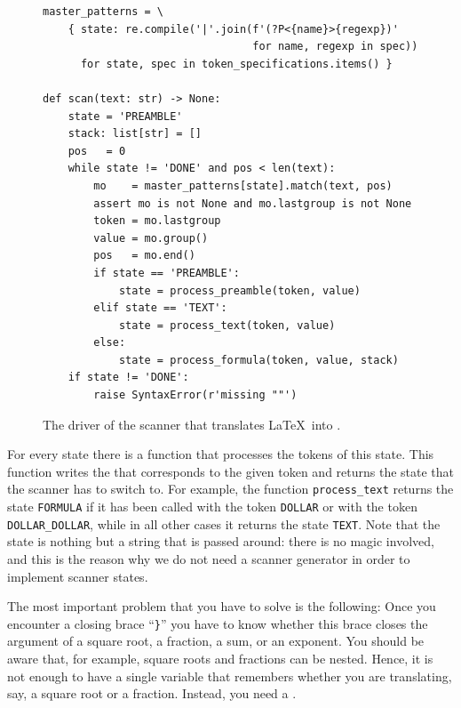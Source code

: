 \begin{figure}[!ht]
\centering
  \begin{verbatim}
master_patterns = \
    { state: re.compile('|'.join(f'(?P<{name}>{regexp})'
                                 for name, regexp in spec))
      for state, spec in token_specifications.items() }

def scan(text: str) -> None:
    state = 'PREAMBLE'
    stack: list[str] = []
    pos   = 0
    while state != 'DONE' and pos < len(text):
        mo    = master_patterns[state].match(text, pos)
        assert mo is not None and mo.lastgroup is not None
        token = mo.lastgroup
        value = mo.group()
        pos   = mo.end()
        if state == 'PREAMBLE':
            state = process_preamble(token, value)
        elif state == 'TEXT':
            state = process_text(token, value)
        else:
            state = process_formula(token, value, stack)
    if state != 'DONE':
        raise SyntaxError(r'missing ""')
\end{verbatim}
\vspace*{-0.3cm}
\caption{The driver of the scanner that translates \LaTeX\ into .}
\label{fig:latex2html.py}
\end{figure}

\noindent
For every state there is a function that processes the tokens of this state.  This function writes the
\simtextsc{MathML} that corresponds to the given token and returns the state that the scanner has to switch to.
For example, the function \texttt{process\_text} returns the state \texttt{FORMULA} if it has been called with
the token \texttt{DOLLAR} or with the token \texttt{DOLLAR\_DOLLAR}, while in all other cases it returns the
state \texttt{TEXT}.  Note that the state is nothing but a string that is passed around: there is no magic
involved, and this is the reason why we do not need a scanner generator in order to implement scanner states.

\remarkEng
The most important problem that you have to solve is the following:  Once you encounter a closing brace
``\texttt{\}}'' you have to know whether this brace closes the argument of a square root, a
fraction, a sum, or an exponent.  You should be aware that, for example, square roots and fractions
can be nested.  Hence, it is not enough to have a single variable that remembers whether you are
translating, say, a square root or a fraction.  Instead, you need a \blue{stack}\index{stack}.

